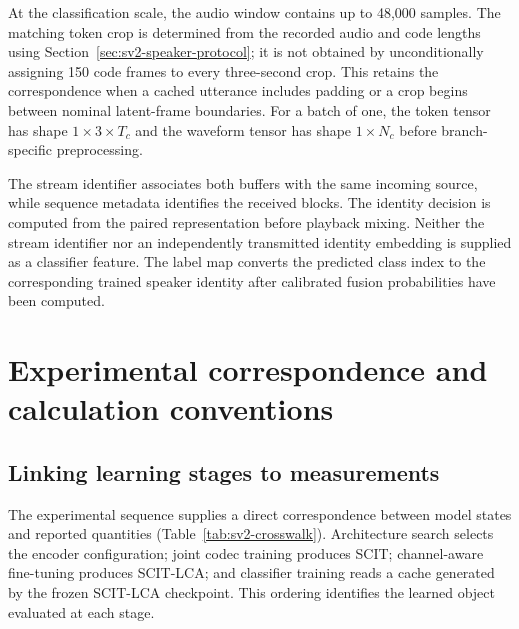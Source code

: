 At the classification scale, the audio window contains up to 48,000 samples. The matching token crop is determined from the recorded audio and code lengths using Section~\ref{sec:sv2-speaker-protocol}; it is not obtained by unconditionally assigning 150 code frames to every three-second crop. This retains the correspondence when a cached utterance includes padding or a crop begins between nominal latent-frame boundaries. For a batch of one, the token tensor has shape $1\times3\times T_c$ and the waveform tensor has shape $1\times N_c$ before branch-specific preprocessing.

The stream identifier associates both buffers with the same incoming source, while sequence metadata identifies the received blocks. The identity decision is computed from the paired representation before playback mixing. Neither the stream identifier nor an independently transmitted identity embedding is supplied as a classifier feature. The label map converts the predicted class index to the corresponding trained speaker identity after calibrated fusion probabilities have been computed.

\FloatBarrier
\raggedbottom

\section{Experimental correspondence and calculation conventions}
\label{sec:sv2-correspondence}

\subsection{Linking learning stages to measurements}
The experimental sequence supplies a direct correspondence between model states and reported quantities (Table~\ref{tab:sv2-crosswalk}). Architecture search selects the encoder configuration; joint codec training produces SCIT; channel-aware fine-tuning produces SCIT-LCA; and classifier training reads a cache generated by the frozen SCIT-LCA checkpoint. This ordering identifies the learned object evaluated at each stage.

